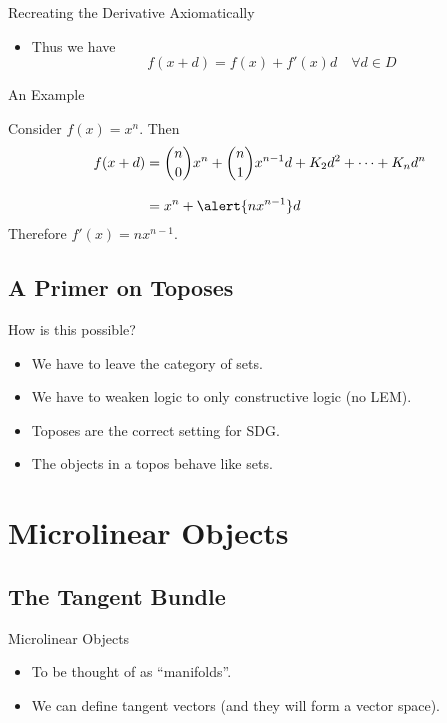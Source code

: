 \documentclass{beamer}
\begin{document}
\begin{frame}{Recreating the Derivative Axiomatically}
  \begin{itemize}
    \item Thus we have
      \begin{equation*}
        f(x+d) = f(x) + f'(x)d\quad \forall d\in D
      \end{equation*}
  \end{itemize}
\end{frame}

\begin{frame}{An Example}
  \begin{exmp}
    Consider \( f(x) = x^n \). Then
    \begin{align*}
      f(x+d) &= \binom{n}{0}x^n + \binom{n}{1}x^{n-1}d + K_2d^2 + \dots + K_nd^n  \\[2ex]
             &= x^n + \alert{nx^{n-1}}d
    \end{align*}
    Therefore \( f'(x) = nx^{n-1} \).
  \end{exmp}
\end{frame}

\subsection{A Primer on Toposes}

\begin{frame}{How is this possible?}
  \begin{itemize}
    \item<1-> We have to leave the category of sets.
    \item<2-> We have to weaken logic to only constructive logic (no LEM).
    \item<3-> Toposes are the correct setting for SDG.
    \item<4-> The objects in a topos behave like sets.
  \end{itemize}
\end{frame}

\section{Microlinear Objects}

\subsection{The Tangent Bundle}

\begin{frame}{Microlinear Objects}

\begin{itemize}
  \item To be thought of as ``manifolds''.
  \item We can define tangent vectors (and they will form a vector space).
\end{itemize}

\end{frame}
\end{document}
